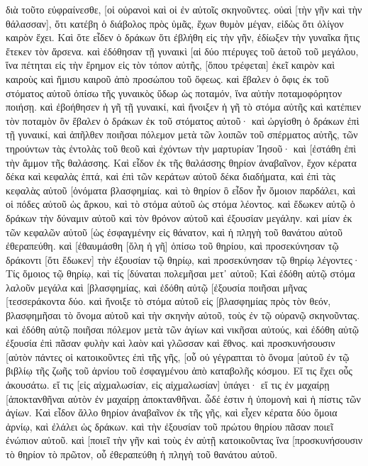 διὰ τοῦτο εὐφραίνεσθε, [οἱ οὐρανοὶ καὶ οἱ ἐν αὐτοῖς σκηνοῦντες. οὐαὶ [τὴν γῆν καὶ τὴν θάλασσαν], ὅτι κατέβη ὁ διάβολος πρὸς ὑμᾶς, ἔχων θυμὸν μέγαν, εἰδὼς ὅτι ὀλίγον καιρὸν ἔχει. 
Καὶ ὅτε εἶδεν ὁ δράκων ὅτι ἐβλήθη εἰς τὴν γῆν, ἐδίωξεν τὴν γυναῖκα ἥτις ἔτεκεν τὸν ἄρσενα. 
καὶ ἐδόθησαν τῇ γυναικὶ [αἱ δύο πτέρυγες τοῦ ἀετοῦ τοῦ μεγάλου, ἵνα πέτηται εἰς τὴν ἔρημον εἰς τὸν τόπον αὐτῆς, [ὅπου τρέφεται] ἐκεῖ καιρὸν καὶ καιροὺς καὶ ἥμισυ καιροῦ ἀπὸ προσώπου τοῦ ὄφεως. 
καὶ ἔβαλεν ὁ ὄφις ἐκ τοῦ στόματος αὐτοῦ ὀπίσω τῆς γυναικὸς ὕδωρ ὡς ποταμόν, ἵνα αὐτὴν ποταμοφόρητον ποιήσῃ. 
καὶ ἐβοήθησεν ἡ γῆ τῇ γυναικί, καὶ ἤνοιξεν ἡ γῆ τὸ στόμα αὐτῆς καὶ κατέπιεν τὸν ποταμὸν ὃν ἔβαλεν ὁ δράκων ἐκ τοῦ στόματος αὐτοῦ· 
καὶ ὠργίσθη ὁ δράκων ἐπὶ τῇ γυναικί, καὶ ἀπῆλθεν ποιῆσαι πόλεμον μετὰ τῶν λοιπῶν τοῦ σπέρματος αὐτῆς, τῶν τηρούντων τὰς ἐντολὰς τοῦ θεοῦ καὶ ἐχόντων τὴν μαρτυρίαν Ἰησοῦ· 
καὶ [ἐστάθη ἐπὶ τὴν ἄμμον τῆς θαλάσσης. 
Καὶ εἶδον ἐκ τῆς θαλάσσης θηρίον ἀναβαῖνον, ἔχον κέρατα δέκα καὶ κεφαλὰς ἑπτά, καὶ ἐπὶ τῶν κεράτων αὐτοῦ δέκα διαδήματα, καὶ ἐπὶ τὰς κεφαλὰς αὐτοῦ [ὀνόματα βλασφημίας. 
καὶ τὸ θηρίον ὃ εἶδον ἦν ὅμοιον παρδάλει, καὶ οἱ πόδες αὐτοῦ ὡς ἄρκου, καὶ τὸ στόμα αὐτοῦ ὡς στόμα λέοντος. καὶ ἔδωκεν αὐτῷ ὁ δράκων τὴν δύναμιν αὐτοῦ καὶ τὸν θρόνον αὐτοῦ καὶ ἐξουσίαν μεγάλην. 
καὶ μίαν ἐκ τῶν κεφαλῶν αὐτοῦ [ὡς ἐσφαγμένην εἰς θάνατον, καὶ ἡ πληγὴ τοῦ θανάτου αὐτοῦ ἐθεραπεύθη. καὶ [ἐθαυμάσθη [ὅλη ἡ γῆ] ὀπίσω τοῦ θηρίου, 
καὶ προσεκύνησαν τῷ δράκοντι [ὅτι ἔδωκεν] τὴν ἐξουσίαν τῷ θηρίῳ, καὶ προσεκύνησαν τῷ θηρίῳ λέγοντες· Τίς ὅμοιος τῷ θηρίῳ, καὶ τίς [δύναται πολεμῆσαι μετ᾽ αὐτοῦ; 
Καὶ ἐδόθη αὐτῷ στόμα λαλοῦν μεγάλα καὶ [βλασφημίας, καὶ ἐδόθη αὐτῷ [ἐξουσία ποιῆσαι μῆνας [τεσσεράκοντα δύο. 
καὶ ἤνοιξε τὸ στόμα αὐτοῦ εἰς [βλασφημίας πρὸς τὸν θεόν, βλασφημῆσαι τὸ ὄνομα αὐτοῦ καὶ τὴν σκηνὴν αὐτοῦ, τοὺς ἐν τῷ οὐρανῷ σκηνοῦντας. 
καὶ ἐδόθη αὐτῷ ποιῆσαι πόλεμον μετὰ τῶν ἁγίων καὶ νικῆσαι αὐτούς, καὶ ἐδόθη αὐτῷ ἐξουσία ἐπὶ πᾶσαν φυλὴν καὶ λαὸν καὶ γλῶσσαν καὶ ἔθνος. 
καὶ προσκυνήσουσιν [αὐτὸν πάντες οἱ κατοικοῦντες ἐπὶ τῆς γῆς, [οὗ οὐ γέγραπται τὸ ὄνομα [αὐτοῦ ἐν τῷ βιβλίῳ τῆς ζωῆς τοῦ ἀρνίου τοῦ ἐσφαγμένου ἀπὸ καταβολῆς κόσμου. 
Εἴ τις ἔχει οὖς ἀκουσάτω. 
εἴ τις [εἰς αἰχμαλωσίαν, εἰς αἰχμαλωσίαν] ὑπάγει· εἴ τις ἐν μαχαίρῃ [ἀποκτανθῆναι αὐτὸν ἐν μαχαίρῃ ἀποκτανθῆναι. ὧδέ ἐστιν ἡ ὑπομονὴ καὶ ἡ πίστις τῶν ἁγίων. 
Καὶ εἶδον ἄλλο θηρίον ἀναβαῖνον ἐκ τῆς γῆς, καὶ εἶχεν κέρατα δύο ὅμοια ἀρνίῳ, καὶ ἐλάλει ὡς δράκων. 
καὶ τὴν ἐξουσίαν τοῦ πρώτου θηρίου πᾶσαν ποιεῖ ἐνώπιον αὐτοῦ. καὶ [ποιεῖ τὴν γῆν καὶ τοὺς ἐν αὐτῇ κατοικοῦντας ἵνα [προσκυνήσουσιν τὸ θηρίον τὸ πρῶτον, οὗ ἐθεραπεύθη ἡ πληγὴ τοῦ θανάτου αὐτοῦ. 
